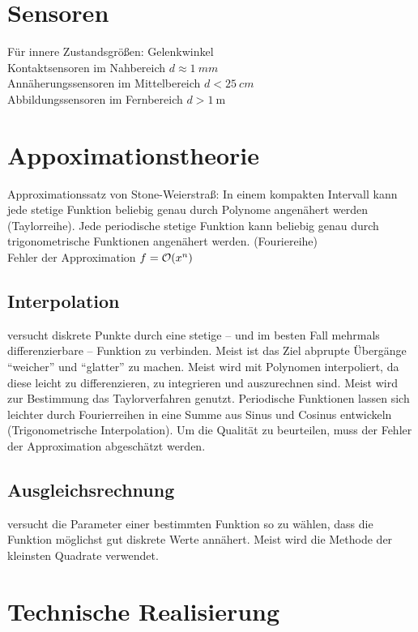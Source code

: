 \documentclass[6pt,a4paper]{scrartcl}
\begin{document}
\begin{multicols}{4}
	
	
\section{Sensoren}
Für innere Zustandsgrößen: Gelenkwinkel\\
Kontaktsensoren im Nahbereich $d \approx \SI{1}{mm}$\\
Annäherungssensoren im Mittelbereich $d < \SI{25}{cm}$\\
Abbildungssensoren im Fernbereich $d > \SI{1}{\meter}$\\
	
	
	
\section{Appoximationstheorie}
Approximationssatz von Stone-Weierstraß: In einem kompakten Intervall kann jede stetige Funktion beliebig genau durch Polynome angenähert werden (Taylorreihe). Jede periodische stetige Funktion kann beliebig genau durch trigonometrische Funktionen angenähert werden. (Fouriereihe)\\
Fehler der Approximation $f = \operatorname{\mathcal O}(x^n)$

\subsection{Interpolation}
versucht diskrete Punkte durch eine stetige -- und im besten Fall mehrmals differenzierbare -- Funktion zu verbinden. Meist ist das Ziel abprupte Übergänge ``weicher'' und ``glatter'' zu machen.	
Meist wird mit Polynomen interpoliert, da diese leicht zu differenzieren, zu integrieren und auszurechnen sind.
Meist wird zur Bestimmung das Taylorverfahren genutzt. 
Periodische Funktionen lassen sich leichter durch Fourierreihen in eine Summe aus Sinus und Cosinus entwickeln (Trigonometrische Interpolation).
Um die Qualität zu beurteilen, muss der Fehler der Approximation abgeschätzt werden.

\subsection{Ausgleichsrechnung}
versucht die Parameter einer bestimmten Funktion so zu wählen, dass die Funktion möglichst gut diskrete Werte annähert.
Meist wird die Methode der kleinsten Quadrate verwendet. 


\section{Technische Realisierung}

\end{multicols}
\end{document}
